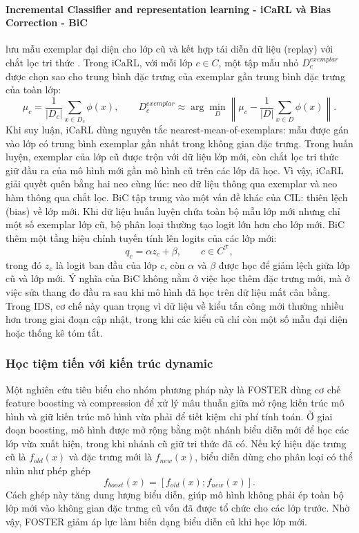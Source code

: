 \paragraph{Incremental Classifier and representation learning - iCaRL và Bias Correction - BiC} lưu mẫu exemplar đại diện cho lớp cũ và kết hợp tái diễn dữ liệu (replay) với chắt lọc tri thức \cite{rebuffi2017icarl}. Trong iCaRL, với mỗi lớp $c\in C$, một tập mẫu nhỏ $D^{exemplar}_c$ được chọn sao cho trung bình đặc trưng của exemplar gần trung bình đặc trưng của toàn lớp:
$$
\mu_c=\frac{1}{|D_c|}\sum_{x\in D_c}\phi(x),
\qquad
D^{exemplar}_c\approx \arg\min_D\left\|\mu_c-\frac{1}{|D|}\sum_{x\in D}\phi(x)\right\|.
$$
Khi suy luận, iCaRL dùng nguyên tắc nearest-mean-of-exemplars: mẫu được gán vào lớp có trung bình exemplar gần nhất trong không gian đặc trưng. Trong huấn luyện, exemplar của lớp cũ được trộn với dữ liệu lớp mới, còn chắt lọc tri thức giữ đầu ra của mô hình mới gần mô hình cũ trên các lớp đã học. Vì vậy, iCaRL giải quyết quên bằng hai neo cùng lúc: neo dữ liệu thông qua exemplar và neo hàm thông qua chắt lọc. BiC \cite{wu2019bic} tập trung vào một vấn đề khác của CIL: thiên lệch (bias) về lớp mới. Khi dữ liệu huấn luyện chứa toàn bộ mẫu lớp mới nhưng chỉ một số exemplar lớp cũ, bộ phân loại thường tạo logit lớn hơn cho lớp mới. BiC thêm một tầng hiệu chỉnh tuyến tính lên logits của các lớp mới:
$$
q_c=\alpha z_c+\beta,\qquad c\in C^{\mathcal{T}},
$$
trong đó $z_c$ là logit ban đầu của lớp $c$, còn $\alpha$ và $\beta$ được học để giảm lệch giữa lớp cũ và lớp mới. Ý nghĩa của BiC không nằm ở việc học thêm đặc trưng mới, mà ở việc sửa thang đo đầu ra sau khi mô hình đã học trên dữ liệu mất cân bằng. Trong IDS, cơ chế này quan trọng vì dữ liệu về kiểu tấn công mới thường nhiều hơn trong giai đoạn cập nhật, trong khi các kiểu cũ chỉ còn một số mẫu đại diện hoặc thống kê tóm tắt.

\subsubsection{Học tiệm tiến với kiến trúc dynamic}

Một nghiên cứu tiêu biểu cho nhóm phương pháp này là FOSTER \cite{wang2022foster} dùng cơ chế feature boosting và compression để xử lý mâu thuẫn giữa mở rộng kiến trúc mô hình và giữ kiến trúc mô hình vừa phải để tiết kiệm chi phí tính toán. Ở giai đoạn boosting, mô hình được mở rộng bằng một nhánh biểu diễn mới để học các lớp vừa xuất hiện, trong khi nhánh cũ giữ tri thức đã có. Nếu ký hiệu đặc trưng cũ là $f_{old}(x)$ và đặc trưng mới là $f_{new}(x)$, biểu diễn dùng cho phân loại có thể nhìn như phép ghép
$$
f_{boost}(x)=[f_{old}(x);f_{new}(x)].
$$
Cách ghép này tăng dung lượng biểu diễn, giúp mô hình không phải ép toàn bộ lớp mới vào không gian đặc trưng cũ vốn đã được tổ chức cho các lớp trước. Nhờ vậy, FOSTER giảm áp lực làm biến dạng biểu diễn cũ khi học lớp mới.

